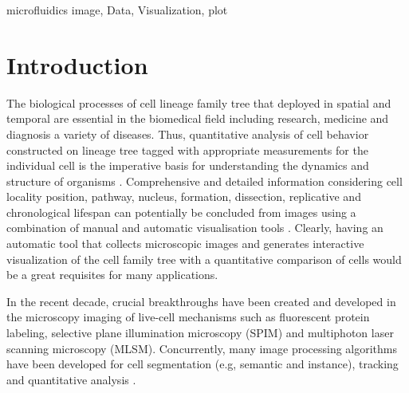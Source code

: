 \documentclass[conference]{IEEEtran}
\begin{document}


\begin{IEEEkeywords}
microfluidics image, Data, Visualization, plot 
\end{IEEEkeywords}

\section{Introduction}

The biological processes of cell lineage family tree that deployed in spatial and temporal are essential in the biomedical field including research, medicine and diagnosis a variety of diseases. Thus, quantitative analysis of cell behavior constructed on lineage tree tagged with appropriate measurements for the individual cell is the imperative basis for understanding the dynamics and structure of organisms \cite{r2.6}. Comprehensive and detailed information considering cell locality position, pathway, nucleus, formation, dissection, replicative and chronological lifespan can potentially be concluded from images using a combination of manual and automatic visualisation tools \cite{r2.7}. Clearly, having an automatic tool that collects microscopic images and generates interactive visualization of the cell family tree with a quantitative comparison of cells would be a great requisites for many applications.

In the recent decade, crucial breakthroughs have been created and developed in the microscopy imaging of live-cell mechanisms such as fluorescent protein labeling, selective plane illumination microscopy (SPIM) and multiphoton laser scanning microscopy (MLSM)\cite{r2.7,r2.8,r2.9}. Concurrently, many image processing algorithms have been developed for cell segmentation (e.g, semantic and instance), tracking and quantitative analysis \cite{r2.10}.
\end{document}
